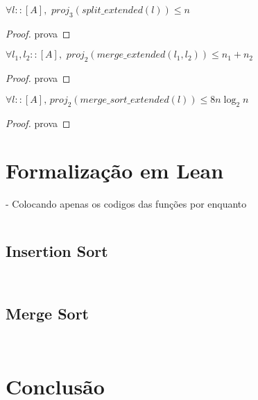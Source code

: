 \documentclass[12pt, oneside, a4paper,english,brazil]{abntex2}
\begin{document}
\begin{teorema}
  $\forall l :: [A], \,\, proj_{3}(split\_extended(l)) \le n$
\end{teorema}

\begin{proof}
  prova
\end{proof}

\begin{teorema}
  $\forall l_{1}, l_{2} :: [A], \,\, proj_{2}(merge\_extended(l_{1}, l_{2})) \le n_{1} + n_{2}$
\end{teorema}

\begin{proof}
  prova
\end{proof}

\begin{teorema}
  $\forall l :: [A], \, proj_{2}(merge\_sort\_extended(l)) \le 8 n \log_{2}n$
\end{teorema}

\begin{proof}
  prova
\end{proof}


\chapter{Formaliza\c{c}\~ao em Lean}
- Colocando apenas os codigos das fun\c{c}\~oes por enquanto

\inputminted{lean}{declarations.lean}
\section{Insertion Sort}
\inputminted{lean}{insertion_sort.lean}
\inputminted{lean}{insertion_sort_modified.lean}

\section{Merge Sort}

\inputminted{lean}{merge_sort.lean}
\inputminted{lean}{merge_sort_modified.lean}

\chapter{Conclus\~ao}

\postextual

% 

\end{document}
